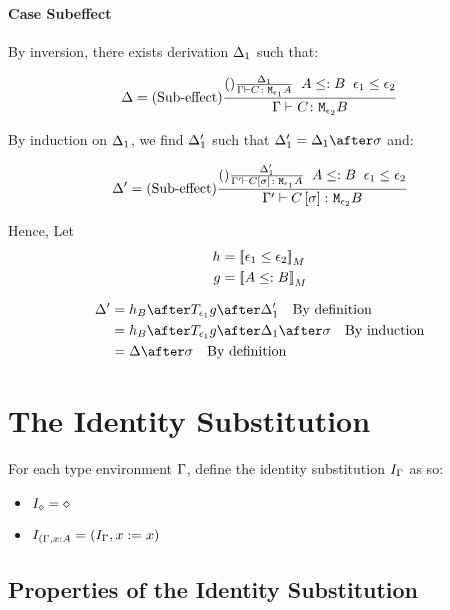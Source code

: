 {    \paragraph{Case Subeffect}

    By inversion, there exists derivation $\Delta_1$ such that:

    \begin{equation}
        \Delta = (\text{Sub-effect}) \frac{(\text{}) \frac{\Delta_1}{\Gamma \vdash C \colon \texttt{M}_{\epsilon_1}{A}}\;\; A\leq: B\;\; \epsilon_1\leq\epsilon_2}{\Gamma \vdash C \colon \texttt{M}_{\epsilon_2}{B}}
    \end{equation}

    By induction on $\Delta_1$, we find $\Delta_1'$ such that $\D_1' = \D_1\after\si$ and:

    \begin{equation}
        \Delta' = (\text{Sub-effect}) \frac{(\text{}) \frac{\Delta_1'}{\Gamma' \vdash C\left[\sigma\right] \colon \texttt{M}_{\epsilon_1}{A}}\;\; A\leq: B\;\; \epsilon_1\leq\epsilon_2}{\Gamma' \vdash C\left[\sigma\right] \colon \texttt{M}_{\epsilon_2}{B}}
    \end{equation}

    Hence,
    Let
    \begin{align}
        h &= {\bf [\![}\epsilon_1\leq\epsilon_2{\bf ]\!]}_M\\
        g &= {\bf [\![}A\leq: B{\bf ]\!]}_M
    \end{align}

    \begin{align}
        \D' &= h_B\after\T{\e_1}{g}\after\D_1'\qt{By definition}\\
            &= h_B\after\T{\e_1}{g}\after\D_1\after\si\qt{By induction}\\
            &= \D\after\si\qt{By definition}\\
    \end{align}
    
    \section{The Identity Substitution}
    For each type environment $\Gamma$, define the identity substitution $I_{\Gamma}$ as so:

    \begin{itemize}
        \item $I_{\diamond} = \diamond$
        \item $I_{(\Gamma, x: A} = (I_{\Gamma}, x:= x)$
    \end{itemize}

    \subsection{Properties of the Identity Substitution}
}
